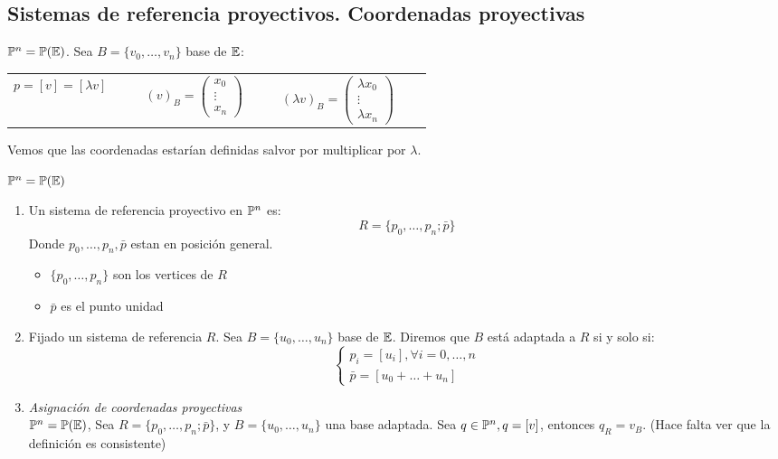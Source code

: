 \subsection{Sistemas de referencia proyectivos. Coordenadas proyectivas}

\begin{obs}
    $\mathbb{P}^n = \mathbb{P}(\mathbb{E})$. Sea $B = \{v_0, \dots, v_n\}$ base de $\mathbb{E}$:
    \begin{center} \begin{tabular}{ccc}
        $p = [v] = [\lambda v] \qquad $ &
        $(v)_B = \begin{pmatrix} x_0 \\ \vdots \\ x_n \end{pmatrix}\qquad $&
        $(\lambda v)_B = \begin{pmatrix} \lambda x_0 \\ \vdots \\ \lambda x_n \end{pmatrix} \qquad$
    \end{tabular} \end{center}
    Vemos que las coordenadas estarían definidas salvor por multiplicar por $\lambda$.
\end{obs}
\begin{defi}
    $\mathbb{P}^n = \mathbb{P}(\mathbb{E})$
    \begin{enumerate}
        \item Un sistema de referencia proyectivo en $\mathbb{P}^n$ es:
            \[ R= \{ p_0, \dots, p_n; \bar{p} \} \]
            Donde $p_0, \dots, p_n, \bar{p}$ estan en posición general.
            \begin{itemize}
                \item $\{ p_0, \dots, p_n \}$ son los vertices de $R$
                \item $\bar{p}$ es el punto unidad
            \end{itemize}
        \item Fijado un sistema de referencia $R$. Sea $B = \{ u_0, \dots, u_n \}$ base de $\mathbb{E}$. Diremos que $B$ está adaptada a $R$ si y solo si:
            \[ \begin{cases} p_i = [u_i], \forall i = 0, \dots, n \\ \bar{p} = [u_0 + \dots + u_n ] \end{cases} \]
        \item \textit{Asignación de coordenadas proyectivas} \\
            $\mathbb{P}^n = \mathbb{P}(\mathbb{E})$, Sea $R = \{ p_0, \dots, p_n; \bar{p} \}$, y $B = \{u_0, \dots, u_n\}$ una base adaptada. Sea $q \in \mathbb{P}^n, q = [v]$, entonces 
            $q_R = v_B$. (Hace falta ver que la definición es consistente)
    \end{enumerate}
\end{defi}
